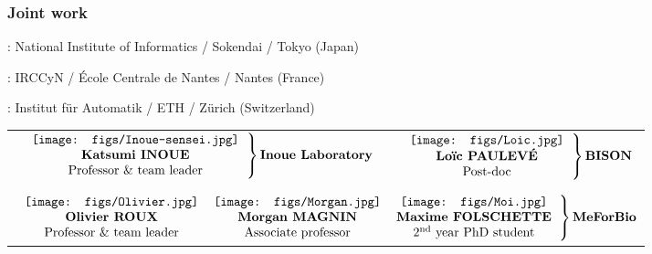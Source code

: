 \begin{frame}[c]
  \frametitle{Joint work}

: National Institute of Informatics / Sokendai / Tokyo (Japan)

\smallskip
{}: IRCCyN / École Centrale de Nantes / Nantes (France)

\smallskip
{}: Institut für Automatik / ETH / Zürich (Switzerland)

\bigskip\bigskip\footnotesize
\begin{tabular}{cc}
  $\left.\text{\begin{tabular}{c}
    \texttt{[image: figs/Inoue-sensei.jpg]} \\ \tval{Katsumi INOUE} \\ Professor \& team leader
  \end{tabular}}\right\}\text{\tval{Inoue Laboratory}}$
  &
  $\left.\text{\begin{tabular}{c}
    \texttt{[image: figs/Loic.jpg]} \\ \tval{Loïc PAULEVÉ} \\ Post-doc
  \end{tabular}}\right\}\text{\tval{BISON}}$
  \\ & \\ & \\
  \multicolumn{2}{l}{$\left.\text{\begin{tabular}{ccc}
      \texttt{[image: figs/Olivier.jpg]}
    & \texttt{[image: figs/Morgan.jpg]}
    & \texttt{[image: figs/Moi.jpg]} \\
      \tval{Olivier ROUX} & \tval{Morgan MAGNIN} & \tval{Maxime FOLSCHETTE} \\
      Professor \& team leader & Associate professor & 2\textsuperscript{nd} year PhD student
  \end{tabular}}\right\}\text{\tval{MeForBio}}$}
\end{tabular}
\end{frame}
